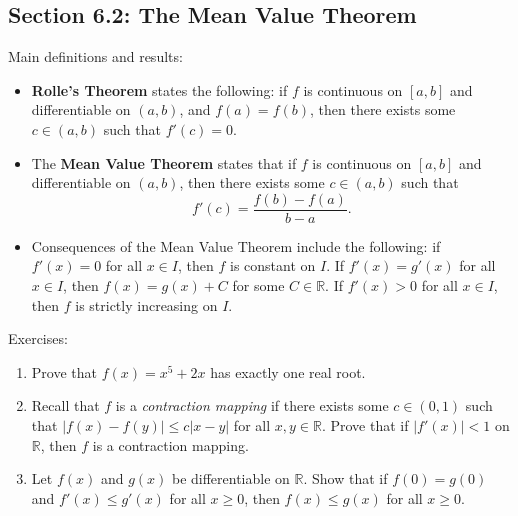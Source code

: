 \documentclass[letterpaper,12pt]{article}
\newcommand{\R}{\mathbb{R}}
\newcommand{\abs}[1]{\lvert #1\rvert}
\begin{document}
\subsection*{Section 6.2: The Mean Value Theorem}
Main definitions and results:
\begin{itemize}
 \item {\bf Rolle's Theorem} states the following: if $f$ is continuous on $[a,b]$ and differentiable on $(a,b)$, and $f(a)=f(b)$, then there exists some $c\in (a,b)$ such that $f'(c)=0$.
 \item The {\bf Mean Value Theorem} states that if $f$ is continuous on $[a,b]$ and differentiable on $(a,b)$, then there exists some $c\in (a,b)$ such that
\[
 f'(c) = \frac{f(b)-f(a)}{b-a}.
\]
 \item Consequences of the Mean Value Theorem include the following: if $f'(x)=0$ for all $x\in I$, then $f$ is constant on $I$. If $f'(x)=g'(x)$ for all $x\in I$, then $f(x)=g(x)+C$ for some $C\in\R$. If $f'(x)>0$ for all $x\in I$, then $f$ is strictly increasing on $I$.
\end{itemize}

\noindent Exercises:
\begin{enumerate}
 \item Prove that $f(x)=x^5+2x$ has exactly one real root.
 \item Recall that $f$ is a {\em contraction mapping} if there exists some $c\in (0,1)$ such that $\abs{f(x)-f(y)}\leq c\abs{x-y}$ for all $x,y\in\R$. Prove that if $\abs{f'(x)}<1$ on $\R$, then $f$ is a contraction mapping.
 \item Let $f(x)$ and $g(x)$ be differentiable on $\R$. Show that if $f(0)=g(0)$ and $f'(x)\leq g'(x)$ for all $x\geq 0$, then $f(x)\leq g(x)$ for all $x\geq 0$.
\end{enumerate}







 
\end{document}

